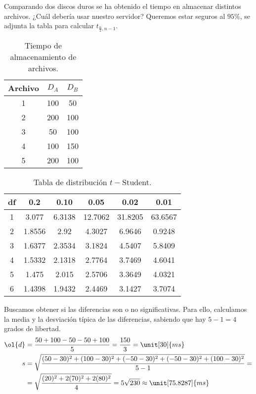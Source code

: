 \documentclass[12pt]{article}
\begin{document}
    \begin{ejercicio}[2 puntos]
        Comparando dos discos duros se ha obtenido el tiempo en almacenar distintos archivos. ¿Cuál debería usar nuestro servidor? Queremos estar seguros al $95\%$, se adjunta la tabla para calcular $t_{\frac{\alpha}{2},n-1}$.
        \begin{table}[H]
        \centering
        \begin{tabular}{c|c|c}
            Archivo & $D_A$ & $D_B$ \\
            \hline
            1     & 100 & 50 \\
            2     & 200 & 100 \\
            3     & 50 & 100 \\
            4     & 100 & 150 \\
            5     & 200 & 100
        \end{tabular}
        \caption{Tiempo de almacenamiento de archivos.}
        \end{table}
        \begin{table}[H]
        \centering
        \begin{tabular}{c|c|c|c|c|c|}
            df & 0.2 & 0.10 & 0.05 & 0.02 & 0.01 \\
            \hline
            1 & 3.077 & 6.3138 & 12.7062 & 31.8205 & 63.6567 \\
            2 & 1.8556 & 2.92 & 4.3027 & 6.9646 & 0.9248 \\
            3 & 1.6377 & 2.3534 & 3.1824 & 4.5407 & 5.8409 \\
            4 & 1.5332 & 2.1318 & 2.7764 & 3.7469 & 4.6041 \\
            5 & 1.475 & 2.015 & 2.5706 & 3.3649 & 4.0321 \\
            6 & 1.4398 & 1.9432 & 2.4469 & 3.1427 & 3.7074
        \end{tabular}
        \caption{Tabla de distribución $t-$Student.}
        \end{table}

        Buscamos obtener si las diferencias son o no significativas. Para ello, calculamos la media y la desviación típica de las diferencias, sabiendo que hay $5-1=4$ grados de libertad.
        \begin{align*}
            \ol{d} &= \frac{50 + 100 - 50 - 50 + 100}{5} = \frac{150}{3} = \unit[30]{ms}\\
            s &= \sqrt{\frac{(50 - 30)^2 + (100 - 30)^2 + (-50 - 30)^2 + (-50 - 30)^2 + (100 - 30)^2}{5-1}}
            =\\&= \sqrt{\frac{(20)^2 + 2(70)^2 + 2(80)^2}{4}}
            = 5\sqrt{230} \approx \unit[75.8287]{ms}
        \end{align*}


\end{ejercicio}
\end{document}
